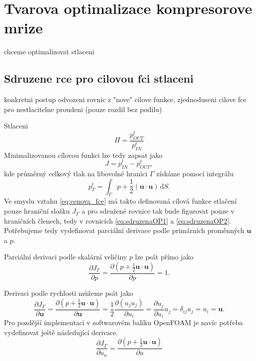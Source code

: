 

\chapter{Tvarova optimalizace kompresorove mrize}

chceme optimalizovat stlaceni

\section{Sdruzene rce pro cilovou fci stlaceni}
konkretni postup odvozeni rovnic z "nove" cilove funkce, zjednoduseni cilove fce pro nestlacitelne proudeni (pouze rozdil bez podilu)

Stlaceni
\begin{equation}\label{key}
	\Pi = \dfrac{p_{OUT}^{t}}{p_{IN}^{t}}
\end{equation}
Minimalizovanou cílovou funkci lze tedy zapsat jako
\begin{equation}\label{key}
	J =  p_{IN}^{t} - p_{OUT}^{t},
\end{equation}
kde průměrný celkový tlak na libovolné hranici $ \Gamma $ získáme pomocí integrálu
\begin{equation}\label{key}
	p^t_\Gamma = \int_\Gamma p+\dfrac{1}{2}(\mathbf{u}\cdot \mathbf{u}) \, \mathrm{d}S.
\end{equation}
Ve smyslu vztahu \ref{eq:cenova_fce} má takto definovaná cílová funkce stlačení pouze hraniční složku $ J_\Gamma $ a pro sdružené rovnice tak bude figurovat pouze v hraničních členech, tedy v rovnicích \ref{eq:sdruzenaOP1} a \ref{eq:sdruzenaOP2}. Potřebujeme tedy vydefinovat parciální derivace podle primárních proměnných $ \mathbf{u} $ a $ p $.

Parciální derivaci podle skalární veličiny $p$ lze psát přímo jako
\begin{equation}\label{key}
\dfrac{\partial J_\Gamma}{\partial p}
=
\dfrac
{\partial 
	\left( 
		p + \frac{1}{2} \mathbf{u}\cdot\mathbf{u} 
	\right)}
{\partial p}
= 1.
\end{equation}

Derivaci podle rychlosti můžeme psát jako
\begin{equation}\label{key}
\dfrac{\partial J_\Gamma}{\partial \mathbf{u}}
=
\dfrac{\partial \left( p + \frac{1}{2} \mathbf{u}\cdot\mathbf{u} \right)}{\partial \mathbf{u}}
=
\frac{1}{2}\dfrac{\partial \left( u_j u_j \right)}{\partial u_i} = \dfrac{\partial  u_j  }{\partial u_i}u_j = \delta_{ij}u_j=u_i=\mathbf{u}.
\end{equation}
Pro pozdější implementaci v softwarovém balíku OpenFOAM je navíc potřeba vydefinovat ještě následující derivace.
\begin{equation}\label{key}
\frac{\partial J_\Gamma}{\partial u_n} = 
\dfrac{\partial \left( p + \frac{1}{2} \mathbf{u}\cdot\mathbf{u} \right)}{\partial u}
\end{equation}

